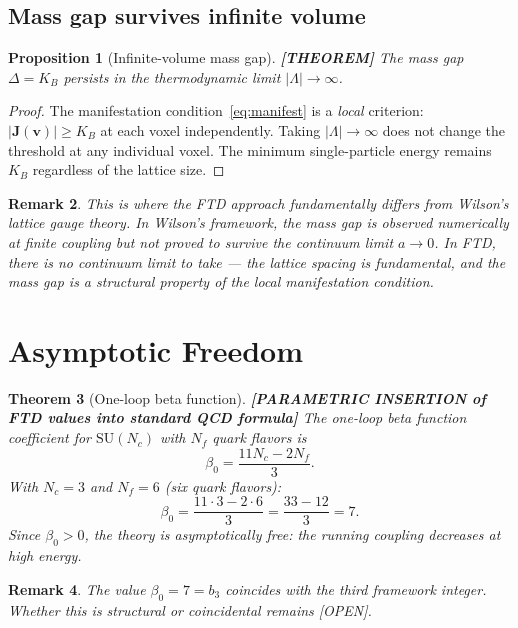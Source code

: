 \documentclass[11pt]{article}
\theoremstyle{tight}
\newtheorem{theorem}{Theorem}[section]
\newtheorem{proposition}[theorem]{Proposition}
\theoremstyle{plainroman}
\newtheorem{remark}[theorem]{Remark}
\begin{document}
\subsection{Mass gap survives infinite volume}

\begin{proposition}[Infinite-volume mass gap]\label{prop:infinite}
\textbf{[THEOREM]}
The mass gap $\Delta=K_B$ persists in the thermodynamic limit $|\Lambda|\to\infty$.
\end{proposition}
\begin{proof}
The manifestation condition~\eqref{eq:manifest} is a \emph{local} criterion: $|\mathbf J(\mathbf v)|\ge K_B$ at each voxel independently.
Taking $|\Lambda|\to\infty$ does not change the threshold at any individual voxel.
The minimum single-particle energy remains $K_B$ regardless of the lattice size.
\end{proof}

\begin{remark}
This is where the FTD approach fundamentally differs from Wilson's lattice gauge theory.
In Wilson's framework, the mass gap is observed numerically at finite coupling but not proved to survive the continuum limit $a\to 0$.
In FTD, there is no continuum limit to take --- the lattice spacing is fundamental, and the mass gap is a structural property of the local manifestation condition.
\end{remark}

\section{Asymptotic Freedom}

\begin{theorem}[One-loop beta function]\label{thm:beta}
\textbf{[PARAMETRIC INSERTION of FTD values into standard QCD formula]}
The one-loop beta function coefficient for $\mathrm{SU}(N_c)$ with $N_f$ quark flavors is
\[
\beta_0=\frac{11N_c-2N_f}{3}.
\]
With $N_c=3$ and $N_f=6$ (six quark flavors):
\begin{equation}\label{eq:beta0}
\beta_0=\frac{11\cdot 3-2\cdot 6}{3}=\frac{33-12}{3}=7.
\end{equation}
Since $\beta_0>0$, the theory is asymptotically free: the running coupling decreases at high energy.
\end{theorem}

\begin{remark}
The value $\beta_0=7=b_3$ coincides with the third framework integer.
Whether this is structural or coincidental remains [OPEN].
\end{remark}
\end{document}

